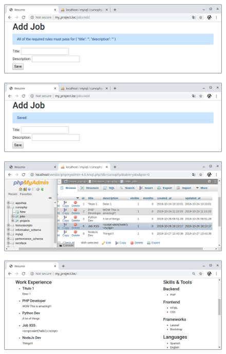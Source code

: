 \documentclass{article}
\begin{document}
\begin{figure}[h!]
  \centering
  \includegraphics[scale=0.5]{./Pictures/168_erro_empty_ok.png}
\end{figure}

\begin{figure}[h!]
  \centering
  \includegraphics[scale=0.5]{./Pictures/169_saved.png}
\end{figure}

\newpage

\begin{figure}[h!]
  \centering
  \includegraphics[scale=0.5]{./Pictures/170_bd.png}
\end{figure}

\begin{figure}[h!]
  \centering
  \includegraphics[scale=0.5]{./Pictures/171_jobs_root.png}
\end{figure}
\end{document}
